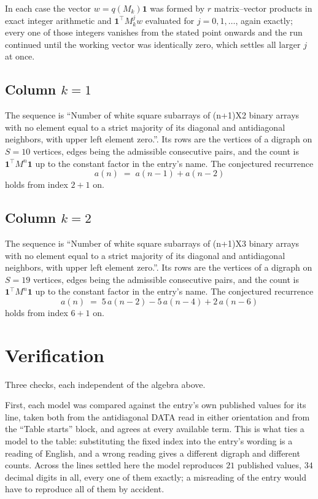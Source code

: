 \documentclass[11pt,a4paper]{article}
\theoremstyle{plain}
\theoremstyle{definition}
\begin{document}
In each case the vector $w=q(M_k)\mathbf{1}$ was formed by $r$ matrix--vector products in
exact integer arithmetic and $\mathbf{1}^{\!\top}M_k^{j}w$ evaluated for $j=0,1,\dots$,
again exactly; every one of those integers vanishes from the stated point onwards and the run
continued until the working vector was identically zero, which settles all larger $j$ at once.

\subsection*{Column $k$$=1$}
The sequence is ``Number of white square subarrays of (n+1)X2 binary arrays with no element equal to a strict majority of its diagonal and antidiagonal neighbors, with upper left element zero.''. Its rows are the vertices of a digraph on
$S=10$ vertices, edges being the admissible consecutive pairs, and the count is
$\mathbf{1}^{\!\top}M^{n}\mathbf{1}$ up to the constant factor in the entry's name.
The conjectured recurrence
\[
a(n)\;=\;a(n-1) + a(n-2)
\]
holds from index $2+1$ on.

\subsection*{Column $k$$=2$}
The sequence is ``Number of white square subarrays of (n+1)X3 binary arrays with no element equal to a strict majority of its diagonal and antidiagonal neighbors, with upper left element zero.''. Its rows are the vertices of a digraph on
$S=19$ vertices, edges being the admissible consecutive pairs, and the count is
$\mathbf{1}^{\!\top}M^{n}\mathbf{1}$ up to the constant factor in the entry's name.
The conjectured recurrence
\[
a(n)\;=\;5\,a(n-2) - 5\,a(n-4) + 2\,a(n-6)
\]
holds from index $6+1$ on.

\section{Verification}

Three checks, each independent of the algebra above.

First, each model was compared against the entry's own published values for its line, taken
both from the antidiagonal DATA read in either orientation and from the ``Table starts''
block, and agrees at every available term. This is what ties a model to the table:
substituting the fixed index into the entry's wording is a reading of English, and a wrong
reading gives a different digraph and different counts. Across the lines settled here the
model reproduces $21$ published values, $34$ decimal digits in all, every one of
them exactly; a misreading of the entry would have to reproduce all of them by accident.
\end{document}
